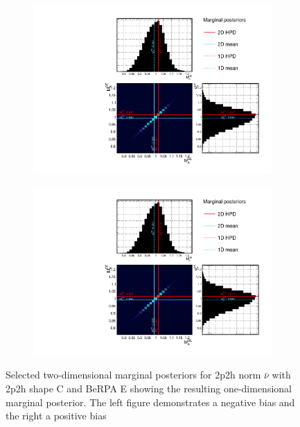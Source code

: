 \begin{figure}[h]
	\begin{subfigure}[t]{0.49\textwidth}
		\includegraphics[width=\textwidth, trim={0mm 0mm 0mm 0mm}, clip,page=55]{figures/mach3/mcmc/2017b_NewDet_3Xsec_4Det_5Flux_NewXSecTune_Asimov_merge_marg_xsec}
	\end{subfigure}
	\begin{subfigure}[t]{0.49\textwidth}
		\includegraphics[width=\textwidth, trim={0mm 0mm 0mm 0mm}, clip,page=60]{figures/mach3/mcmc/2017b_NewDet_3Xsec_4Det_5Flux_NewXSecTune_Asimov_merge_marg_xsec}
	\end{subfigure}
	\caption{Selected two-dimensional marginal posteriors for 2p2h norm $\bar{\nu}$ with 2p2h shape C and BeRPA E showing the resulting one-dimensional marginal posterior. The left figure demonstrates a negative bias and the right a positive bias}
	\label{fig:marginalisation_2p2h_norm_nubar}
\end{figure}

